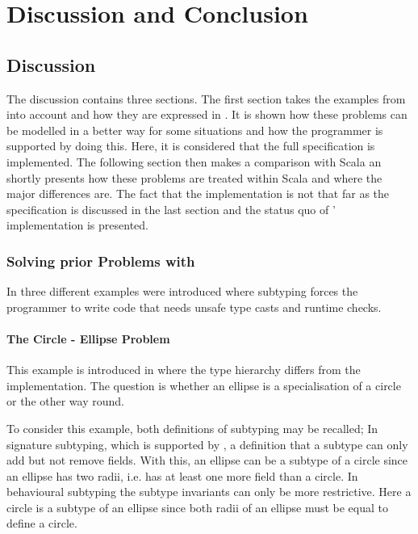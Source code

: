 
\chapter{Discussion and Conclusion}
\label{ctr:discussionConclusion}
\section{Discussion}
\label{ctr:discussion}
The discussion contains three sections. The first section takes the examples from
 into account and how they are expressed
in \ooplss. It is shown how these problems can be modelled in a better
way for some situations and how the programmer is supported by doing this. 
Here, it is considered that the full specification is implemented. The following
section then makes a comparison with Scala an shortly presents how
these problems are treated within Scala and where the major differences
are. The fact that the implementation is not that far as the specification
is discussed in the last section and the status quo of \ooplss'
implementation is presented.

\subsection{Solving prior Problems with \ooplss}
In  three different examples were
introduced where subtyping forces the programmer to write code that
needs unsafe type casts and runtime checks.

\subsubsection{The Circle - Ellipse Problem}
This example is introduced in  where the type
hierarchy differs from the implementation. The question is whether an ellipse
is a specialisation of a circle or the other way round.

To consider this example, both definitions of subtyping may be recalled;
In signature subtyping, which is supported by \ooplss, a
definition that a subtype can only add but not remove fields. With this,
an ellipse can be a subtype of a circle since an ellipse has two radii,
i.e. has at least one more field than a circle. In behavioural subtyping
the subtype invariants can only be more restrictive. Here a circle is
a subtype of an ellipse since both radii of an ellipse must be equal
to define a circle.

